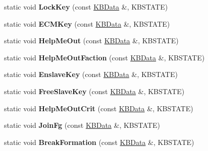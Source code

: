 \begin{DoxyCompactItemize}
\item 
static void {\bfseries Lock\+Key} (const \hyperlink{classKBData}{K\+B\+Data} \&, K\+B\+S\+T\+A\+TE)\hypertarget{classFireKeyboard_a23cd8230fb5c89b4b26f7777999913cc}{}\label{classFireKeyboard_a23cd8230fb5c89b4b26f7777999913cc}

\item 
static void {\bfseries E\+C\+M\+Key} (const \hyperlink{classKBData}{K\+B\+Data} \&, K\+B\+S\+T\+A\+TE)\hypertarget{classFireKeyboard_a922cc298f681c04e43a93319f7a5f02c}{}\label{classFireKeyboard_a922cc298f681c04e43a93319f7a5f02c}

\item 
static void {\bfseries Help\+Me\+Out} (const \hyperlink{classKBData}{K\+B\+Data} \&, K\+B\+S\+T\+A\+TE)\hypertarget{classFireKeyboard_abbdd581775c9d488b4de10e75c67ae8c}{}\label{classFireKeyboard_abbdd581775c9d488b4de10e75c67ae8c}

\item 
static void {\bfseries Help\+Me\+Out\+Faction} (const \hyperlink{classKBData}{K\+B\+Data} \&, K\+B\+S\+T\+A\+TE)\hypertarget{classFireKeyboard_a5ed9387ccf70af75abfb6f9f2e73e101}{}\label{classFireKeyboard_a5ed9387ccf70af75abfb6f9f2e73e101}

\item 
static void {\bfseries Enslave\+Key} (const \hyperlink{classKBData}{K\+B\+Data} \&, K\+B\+S\+T\+A\+TE)\hypertarget{classFireKeyboard_a6809cc3ab7669d27014c597f41382691}{}\label{classFireKeyboard_a6809cc3ab7669d27014c597f41382691}

\item 
static void {\bfseries Free\+Slave\+Key} (const \hyperlink{classKBData}{K\+B\+Data} \&, K\+B\+S\+T\+A\+TE)\hypertarget{classFireKeyboard_ad22c9d5ea95c27c3a302d0dd2fb0c9b4}{}\label{classFireKeyboard_ad22c9d5ea95c27c3a302d0dd2fb0c9b4}

\item 
static void {\bfseries Help\+Me\+Out\+Crit} (const \hyperlink{classKBData}{K\+B\+Data} \&, K\+B\+S\+T\+A\+TE)\hypertarget{classFireKeyboard_a707200cc5aaf58d89a73977aa169be4e}{}\label{classFireKeyboard_a707200cc5aaf58d89a73977aa169be4e}

\item 
static void {\bfseries Join\+Fg} (const \hyperlink{classKBData}{K\+B\+Data} \&, K\+B\+S\+T\+A\+TE)\hypertarget{classFireKeyboard_a980d859e111e79c990f579cdcfc206d5}{}\label{classFireKeyboard_a980d859e111e79c990f579cdcfc206d5}

\item 
static void {\bfseries Break\+Formation} (const \hyperlink{classKBData}{K\+B\+Data} \&, K\+B\+S\+T\+A\+TE)\hypertarget{classFireKeyboard_a34c06ddd49d67347981d6671c436bcb7}{}\label{classFireKeyboard_a34c06ddd49d67347981d6671c436bcb7}


\end{DoxyCompactItemize}
